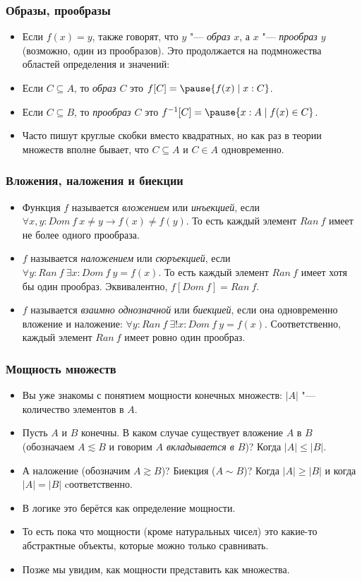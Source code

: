 \documentclass[10pt]{beamer}
\begin{document}
\begin{frame}
    \frametitle{Образы, прообразы}
    \begin{itemize}
        \item Если $f(x) = y$, также говорят, что $y$ "--- \emph{образ $x$}, а $x$ "--- \emph{прообраз $y$} (возможно, один из прообразов). Это продолжается на подмножества областей определения и значений: 
        \item Если $C \subseteq A$, то \emph{образ $C$} это $f[C] = \pause \{f(x) \mid x : C\}$.
        \pause
        \item Если $C \subseteq B$, то \emph{прообраз $C$} это $f^{-1}[C] = \pause \{x : A \mid f(x) \in C\}$.
        \item Часто пишут круглые скобки вместо квадратных, но как раз в теории множеств вполне бывает, что $C \subseteq A$ и $C \in A$ одновременно.
    \end{itemize}
\end{frame}

\begin{frame}
    \frametitle{Вложения, наложения и биекции}
    \begin{itemize}
        \item Функция $f$ называется \emph{вложением} или \emph{инъекцией}, если $\forall x,y:Dom\ f~x \neq y \to f(x) \neq f(y)$. То есть каждый элемент $Ran\ f$ имеет не более одного прообраза.
        \item $f$ называется \emph{наложением} или \emph{сюръекцией}, если $\forall y:Ran\ f~\exists x:Dom\ f~y=f(x)$. То есть каждый элемент $Ran\ f$ имеет хотя бы один прообраз. Эквивалентно, $f[Dom\ f] = Ran\ f$.
        \item $f$ называется \emph{взаимно однозначной} или \emph{биекцией}, если она одновременно вложение и наложение: $\forall y:Ran\ f~\exists! x:Dom\ f~y=f(x)$. Соответственно, каждый элемент $Ran\ f$ имеет ровно один прообраз.
    \end{itemize}
\end{frame}

\begin{frame}
    \frametitle{Мощность множеств}
    \begin{itemize}
        \item Вы уже знакомы с понятием мощности конечных множеств: $|A|$ "--- количество элементов в $A$.
        \item Пусть $A$ и $B$ конечны. В каком случае существует вложение $A$ в $B$ (обозначаем $A \lesssim B$ и говорим \emph{$A$ вкладывается в $B$})? \pause Когда $|A| \leq |B|$.
        \pause
        \item А наложение (обозначим $A \gtrsim B$)? Биекция ($A \sim B$)? \pause Когда $|A| \geq |B|$ и \pause когда $|A| = |B|$ cоответственно.
        \pause
        \item В логике это берётся как определение мощности.
        \item То есть пока что мощности (кроме натуральных чисел) это какие-то абстрактные объекты, которые можно только сравнивать.
        \item Позже мы увидим, как мощности представить как множества.
    \end{itemize}
\end{frame}
\end{document}

